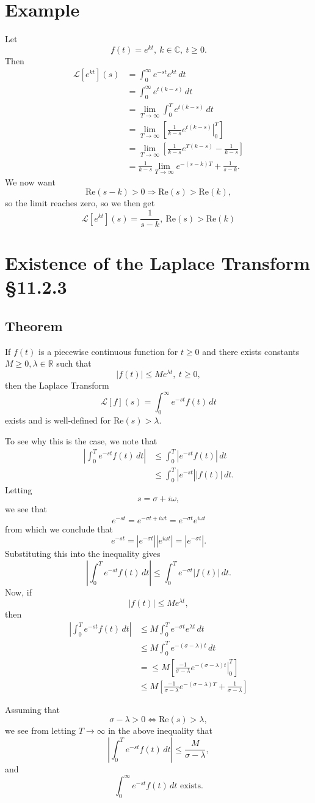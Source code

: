 \documentclass[11pt]{article}
\newcommand{\Laplace}{\mathscr{L}}
\newcommand{\reals}{\mathbb{R}}
\newcommand{\complex}{\mathbb{C}}
\begin{document}
\section{Example}
Let
\[ f(t) = e^{kt},\ k \in \complex,\ t \geq 0. \]
Then
\begin{align*}
\Laplace[e^{kt}](s) &= \int_0^\infty e^{-st}e^{kt}\, dt \\
&= \int_0^\infty e^{t(k-s)}\, dt \\
&= \lim_{T \rightarrow \infty} \int_0^T e^{t(k-s)}\, dt \\
&= \lim_{T \rightarrow \infty} \left[ \left. \frac{1}{k-s}e^{t(k-s)} \right|_0^T \right] \\
&= \lim_{T \rightarrow \infty} \left[ \frac{1}{k-s}e^{T(k-s)} - \frac{1}{k-s} \right] \\
&= \frac{1}{k-s} \lim_{T \rightarrow \infty} e^{-(s-k)T} + \frac{1}{s-k}.
\end{align*}
We now want
\[ \text{Re}(s-k) > 0 \Rightarrow \text{Re}(s) > \text{Re}(k), \]
so the limit reaches zero, so we then get
\[ \Laplace[e^{kt}](s) = \frac{1}{s-k},\ \text{Re}(s) > \text{Re}(k) \]

\section{Existence of the Laplace Transform §11.2.3}
\subsection{Theorem}
If $f(t)$ is a piecewise continuous function for $t \geq 0$ and there exists constants $M \geq 0, \lambda \in \reals$ such that
\[ |f(t)| \leq Me^{\lambda t},\ t \geq 0, \] 
then the Laplace Transform
\[ \Laplace[f](s) = \int_0^\infty e^{-st}f(t)\, dt \]
exists and is well-defined for $\text{Re}(s) > \lambda$.

To see why this is the case, we note that
\begin{align*}
\left| \int_0^T e^{-st} f(t)\, dt \right| &\leq \int_0^T \left| e^{-st}f(t) \right|\, dt \\
&\leq \int_0^T |e^{-st}| |f(t)| \, dt.
\end{align*}
Letting
\[ s = \sigma + i \omega, \]
we see that
\[ e^{-st} = e^{-\sigma t + i\omega t} = e^{-\sigma t}e^{i \omega t} \]
from which we conclude that
\[ e^{-st} = |e^{-\sigma t}| |e^{i \omega t}| = |e^{-\sigma t}|. \]
Substituting this into the inequality gives
\[ \left| \int_0^T e^{-st} f(t)\, dt \right| \leq \int_0^T e^{-\sigma t} |f(t)| \, dt.  \]
Now, if
\[ |f(t)| \leq Me^{\lambda t}, \]
then
\begin{align*}
\left| \int_0^T e^{-st} f(t)\, dt \right| &\leq M \int_0^T e^{-\sigma t} e^{\lambda t} \, dt \\
&\leq  M \int_0^T e^{-(\sigma - \lambda) t} \, dt \\
&=\leq M \left[ \left. \frac{-1}{\sigma - \lambda} e^{-(\sigma - \lambda)t} \right|_0^T \right] \\
&\leq M \left[ \frac{-1}{\sigma - \lambda} e^{-(\sigma - \lambda)T} + \frac{1}{\sigma - \lambda} \right]
\end{align*}

Assuming that
\[ \sigma - \lambda >0 \Leftrightarrow \text{Re}(s) > \lambda, \]
we see from letting $T \rightarrow \infty$ in the above inequality that 
\[ \left| \int_0^T e^{-st} f(t)\, dt \right| \leq \frac{M}{\sigma - \lambda}, \]
and
\[ \int_0^\infty e^{-st} f(t)\, dt \text{ exists.} \]
\end{document}
